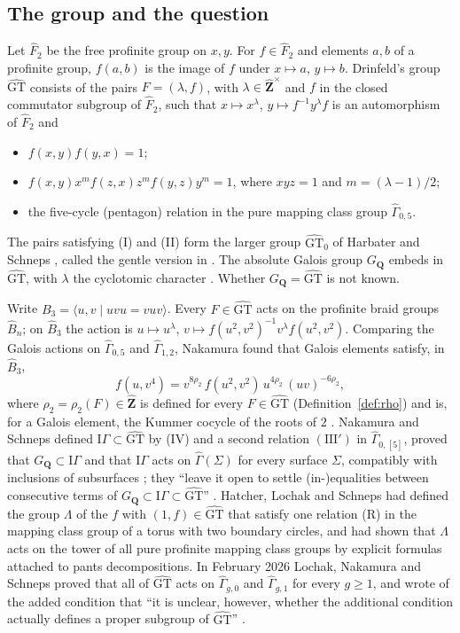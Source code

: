 \documentclass[11pt,a4paper]{article}
\theoremstyle{plain}
\theoremstyle{definition}
\theoremstyle{remark}
\newcommand{\GT}{\widehat{\mathrm{GT}}}
\newcommand{\GTz}{\widehat{\mathrm{GT}}_0}
\newcommand{\Zh}{\widehat{\mathbf Z}}
\newcommand{\GQ}{G_{\mathbf Q}}
\newcommand{\Fh}{\widehat F}
\newcommand{\Bh}{\widehat B}
\newcommand{\Gh}{\widehat\Gamma}
\begin{document}
\subsection*{The group and the question}
Let $\Fh_2$ be the free profinite group on $x,y$. For $f\in\Fh_2$ and elements $a,b$ of a profinite group,
$f(a,b)$ is the image of $f$ under $x\mapsto a$, $y\mapsto b$. Drinfeld's group $\GT$ \cite{D} consists of the pairs
$F=(\lambda,f)$, with $\lambda\in\Zh^\times$ and $f$ in the closed commutator subgroup of $\Fh_2$, such that
$x\mapsto x^\lambda$, $y\mapsto f^{-1}y^\lambda f$ is an automorphism of $\Fh_2$ and
\begin{itemize}
\item[(I)] $f(x,y)f(y,x)=1$;
\item[(II)] $f(x,y)x^{m}f(z,x)z^{m}f(y,z)y^{m}=1$, where $xyz=1$ and $m=(\lambda-1)/2$;
\item[(III)] the five-cycle (pentagon) relation in the pure mapping class group $\Gh_{0,5}$.
\end{itemize}
The pairs satisfying (I) and (II) form the larger group $\GTz$ of Harbater and Schneps \cite{HS}, called the gentle
version in \cite{DG}. The absolute Galois group $\GQ$ embeds in $\GT$, with $\lambda$ the cyclotomic character
\cite{D,I}. Whether $\GQ=\GT$ is not known.

Write $B_3=\langle u,v\mid uvu=vuv\rangle$. Every $F\in\GT$ acts on the profinite braid groups $\Bh_n$; on
$\Bh_3$ the action is $u\mapsto u^\lambda$, $v\mapsto f(u^2,v^2)^{-1}v^\lambda f(u^2,v^2)$. Comparing the Galois
actions on $\Gh_{0,5}$ and $\Gh_{1,2}$, Nakamura found that Galois elements satisfy, in $\Bh_3$,
\[
 f(u,v^4)=v^{8\rho_2}\,f(u^2,v^2)\,u^{4\rho_2}\,(uv)^{-6\rho_2},\tag{IV}
\]
where $\rho_2=\rho_2(F)\in\Zh$ is defined for every $F\in\GT$ (Definition~\ref{def:rho}) and is, for a Galois
element, the Kummer cocycle of the roots of $2$ \cite[\S1 and Definition~5.1]{NS}. Nakamura and Schneps defined
$\mathrm{I}\Gamma\subset\GT$ by (IV) and a second relation $(\mathrm{III}')$ in $\Gh_{0,[5]}$, proved that
$\GQ\subset\mathrm{I}\Gamma$ and that $\mathrm{I}\Gamma$ acts on $\Gh(\Sigma)$ for every surface $\Sigma$,
compatibly with inclusions of subsurfaces \cite[Theorems 1.2--1.4]{NS}; they ``leave it open to settle
(in-)equalities between consecutive terms of $\GQ\subset\mathrm{I}\Gamma\subset\GT$'' \cite[\S1]{NS}. Hatcher,
Lochak and Schneps \cite{HLS} had defined the group $\Lambda$ of the $f$ with $(1,f)\in\GT$ that satisfy one
relation (R) in the mapping class group of a torus with two boundary circles, and had shown that $\Lambda$ acts on
the tower of all pure profinite mapping class groups by explicit formulas attached to pants decompositions. In
February 2026 Lochak, Nakamura and Schneps \cite{LNS} proved that all of $\GT$ acts on $\Gh_{g,0}$ and $\Gh_{g,1}$
for every $g\ge1$, and wrote of the added condition that ``it is unclear, however, whether the additional condition
actually defines a proper subgroup of $\GT$'' \cite[\S1]{LNS}.
\end{document}
